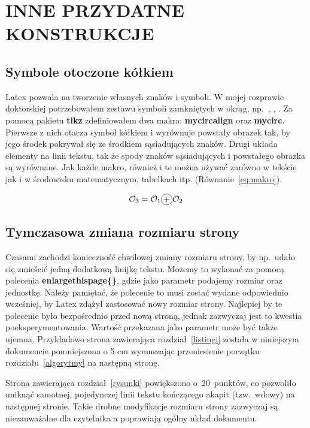 \chapter{INNE PRZYDATNE KONSTRUKCJE}
\section{Symbole otoczone kółkiem}

Latex pozwala na tworzenie własnych znaków i symboli. W mojej rozprawie doktorskiej potrzebowałem zestawu symboli zamkniętych w okrąg, np.\ \mycircalign{+}, \mycircalign{-}, . Za pomocą pakietu \textbf{tikz} zdefiniowałem dwa makra: \textbf{mycircalign} oraz \textbf{mycirc}. Pierwsze z nich otacza symbol kółkiem i wyrównuje powstały obrazek tak, by jego środek pokrywał się ze środkiem sąsiadujących znaków. Drugi układa elementy na linii tekstu, tak że spody znaków sąsiadujących i powstałego obrazka są wyrównane. Jak każde makro, również i te można używać zarówno w tekście jak i w środowisku matematycznym, tabelkach itp. (Równanie~\ref{eq:makro}).

\begin{equation}
  \mathcal{O}_3 = \mathcal{O}_1 \mycircalign{+} \mathcal{O}_2
  \label{eq:makro}
\end{equation}

\section{Tymczasowa zmiana rozmiaru strony}

Czasami zachodzi konieczność chwilowej zmiany rozmiaru strony, by np.\ udało się zmieścić jedną dodatkową linijkę tekstu. Możemy to wykonać za pomocą polecenia \textbf{enlargethispage\{\}}, gdzie jako parametr podajemy rozmiar oraz jednostkę. Należy pamiętać, że polecenie to musi zostać wydane odpowiednio wcześniej, by Latex zdążył zastosować nowy rozmiar strony. Najlepiej by te polecenie było bezpośrednio przed nową stroną, jednak zazwyczaj jest to kwestia poeksperymentowania. Wartość przekazana jako parametr może być także ujemna. Przykładowo strona zawierająca rozdział~\ref{listingi} została w niniejszym dokumencie pomniejszona o 5 cm wymuszając przeniesienie początku rozdziału~\ref{algorytmy} na następną stronę.

Strona zawierająca rozdział~\ref{rysunki} powiększono o~20~punktów, co pozwoliło uniknąć samotnej, pojedynczej linii tekstu kończącego akapit (tzw.\ wdowy) na następnej stronie. Takie drobne modyfikacje rozmiaru strony zazwyczaj są niezauważalne dla czytelnika a poprawiają ogólny układ dokumentu.

